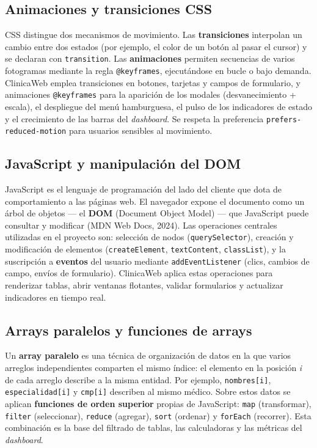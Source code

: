 \documentclass[11pt,a4paper]{article}
\begin{document}
\subsection{Animaciones y transiciones CSS}
CSS distingue dos mecanismos de movimiento. Las \textbf{transiciones} interpolan un cambio entre dos estados (por ejemplo, el color de un botón al pasar el cursor) y se declaran con \lstinline|transition|. Las \textbf{animaciones} permiten secuencias de varios fotogramas mediante la regla \lstinline|@keyframes|, ejecutándose en bucle o bajo demanda. ClinicaWeb emplea transiciones en botones, tarjetas y campos de formulario, y animaciones \lstinline|@keyframes| para la aparición de los modales (desvanecimiento + escala), el despliegue del menú hamburguesa, el pulso de los indicadores de estado y el crecimiento de las barras del \emph{dashboard}. Se respeta la preferencia \lstinline|prefers-reduced-motion| para usuarios sensibles al movimiento.

\subsection{JavaScript y manipulación del DOM}
JavaScript es el lenguaje de programación del lado del cliente que dota de comportamiento a las páginas web. El navegador expone el documento como un árbol de objetos --- el \textbf{DOM} (Document Object Model) --- que JavaScript puede consultar y modificar (MDN Web Docs, 2024). Las operaciones centrales utilizadas en el proyecto son: selección de nodos (\lstinline|querySelector|), creación y modificación de elementos (\lstinline|createElement|, \lstinline|textContent|, \lstinline|classList|), y la suscripción a \textbf{eventos} del usuario mediante \lstinline|addEventListener| (clics, cambios de campo, envíos de formulario). ClinicaWeb aplica estas operaciones para renderizar tablas, abrir ventanas flotantes, validar formularios y actualizar indicadores en tiempo real.

\subsection{Arrays paralelos y funciones de arrays}
Un \textbf{array paralelo} es una técnica de organización de datos en la que varios arreglos independientes comparten el mismo índice: el elemento en la posición \emph{i} de cada arreglo describe a la misma entidad. Por ejemplo, \lstinline|nombres[i]|, \lstinline|especialidad[i]| y \lstinline|cmp[i]| describen al mismo médico. Sobre estos datos se aplican \textbf{funciones de orden superior} propias de JavaScript: \lstinline|map| (transformar), \lstinline|filter| (seleccionar), \lstinline|reduce| (agregar), \lstinline|sort| (ordenar) y \lstinline|forEach| (recorrer). Esta combinación es la base del filtrado de tablas, las calculadoras y las métricas del \emph{dashboard}.
\end{document}

